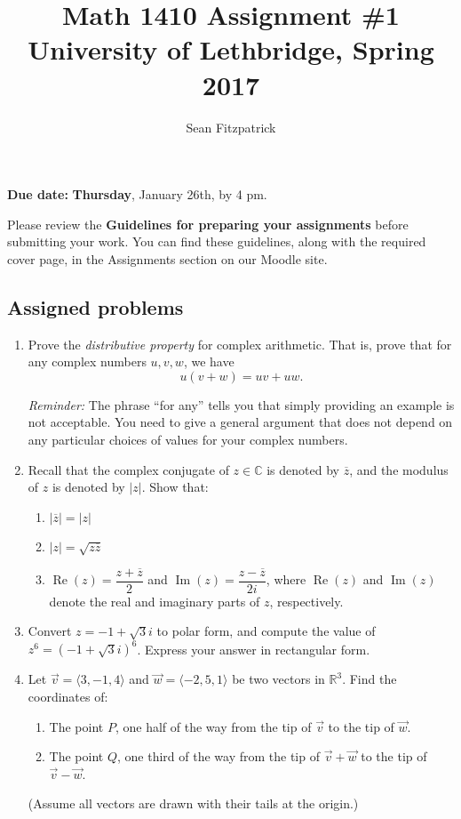 \documentclass[letterpaper,12pt]{article}
\title{Math 1410 Assignment \#1\\University of Lethbridge, Spring 2017}
\author{Sean Fitzpatrick}
\newcommand{\abs}[1]{\lvert #1\rvert}
\newcommand{\R}{\mathbb{R}}
\begin{document}
 \maketitle

{\bf Due date:} {\bf Thursday}, January 26th, by 4 pm.

\bigskip

Please review the {\bf Guidelines for preparing your assignments} before submitting your work. You can find these guidelines, along with the required cover page, in the Assignments section on our Moodle site.



\subsection*{Assigned problems}
\begin{enumerate}
\item Prove the \textit{distributive property} for complex arithmetic. That is, prove that for any complex numbers $u, v, w$, we have
\[
 u(v+w) = uv+uw.
\]

\medskip

\textit{Reminder:} The phrase ``for any'' tells you that simply providing an example is not acceptable. You need to give a general argument that does not depend on any particular choices of values for your complex numbers.

\bigskip

\item Recall that the complex conjugate of $z\in\mathbb{C}$ is denoted by $\overline{z}$, and the modulus of $z$ is denoted by $\abs{z}$. Show that:
\begin{enumerate}
 \item $\abs{\overline{z}} = \abs{z}$
 \item $\abs{z} = \sqrt{z\overline{z}}$
 \item $\operatorname{Re}(z) = \dfrac{z+\overline{z}}{2}$ and $\operatorname{Im}(z) = \dfrac{z-\overline{z}}{2i}$, where $\operatorname{Re}(z)$ and $\operatorname{Im}(z)$ denote the real and imaginary parts of $z$, respectively.
\end{enumerate}

\item Convert $z=-1+\sqrt{3}i$ to polar form, and compute the value of $z^6 = (-1+\sqrt{3}i)^6$. Express your answer in rectangular form.

\item  Let $\vec{v} = \langle 3, -1, 4\rangle$ and $\vec{w} = \langle -2, 5, 1\rangle$ be two vectors in $\R^3$. Find the coordinates of:
\begin{enumerate}
 \item The point $P$, one half of the way from the tip of $\vec{v}$ to the tip of $\vec{w}$.
 \item The point $Q$, one third of the way from the tip of $\vec{v}+\vec{w}$ to the tip of $\vec{v}-\vec{w}$.
\end{enumerate}
(Assume all vectors are drawn with their tails at the origin.)
\end{enumerate}
\end{document}
